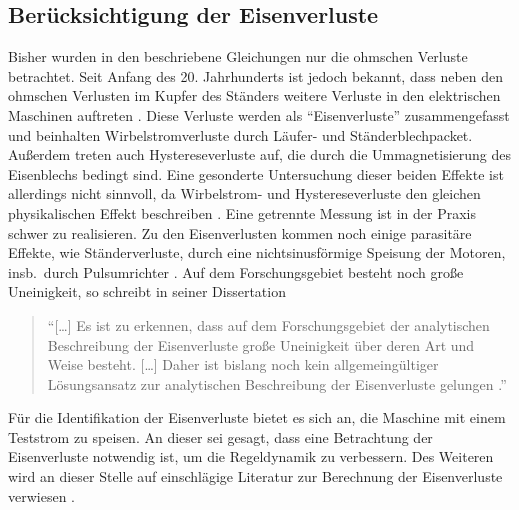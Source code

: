 \documentclass[conference,twocolumn]{IEEEtran}
\begin{document}
\subsection{Berücksichtigung der Eisenverluste}\label{sec:eisenverluste}
Bisher wurden in den beschriebene Gleichungen nur die ohmschen Verluste betrachtet.
Seit Anfang des 20. Jahrhunderts ist jedoch bekannt, dass neben den ohmschen Verlusten im Kupfer des Ständers weitere Verluste in den elektrischen Maschinen auftreten \autocites{reinert_calculation_2001}{stumberger_evaluation_2003}{kilthau_parameter-measurement_2001}{stumberger_evaluation_2003}.
Diese Verluste werden als \enquote{Eisenverluste} zusammengefasst und beinhalten Wirbelstromverluste durch Läufer- und Ständerblechpacket.
Außerdem treten auch Hystereseverluste auf, die durch die Ummagnetisierung des Eisenblechs bedingt sind.
Eine gesonderte Untersuchung dieser beiden Effekte ist allerdings nicht sinnvoll, da Wirbelstrom- und Hystereseverluste den gleichen physikalischen Effekt beschreiben \autocite{reinert_calculation_2001}.
Eine getrennte Messung ist in der Praxis schwer zu realisieren.
Zu den Eisenverlusten kommen noch einige parasitäre Effekte, wie Ständerverluste, durch eine nichtsinusförmige Speisung der Motoren, insb.\ durch Pulsumrichter \autocite{Kellner2012}.
Auf dem Forschungsgebiet besteht noch große Uneinigkeit, so schreibt \textcite{Kellner2012} in seiner Dissertation

\begin{quote}
\enquote{[\ldots] Es ist zu erkennen, dass auf dem Forschungsgebiet der analytischen Beschreibung
der Eisenverluste große Uneinigkeit über deren Art und Weise besteht. [\ldots] Daher ist bislang
noch kein allgemeingültiger Lösungsansatz zur analytischen Beschreibung der
Eisenverluste gelungen \autocite[S.~65]{Kellner2012}.} 
\end{quote}

Für die Identifikation der Eisenverluste bietet es sich an, die Maschine mit einem Teststrom zu speisen.
An dieser sei gesagt, dass eine Betrachtung der Eisenverluste notwendig ist, um die Regeldynamik zu verbessern.
Des Weiteren wird an dieser Stelle auf einschlägige Literatur zur Berechnung der Eisenverluste verwiesen \autocites{Kellner2012}{reinert_calculation_2001}{stumberger_evaluation_2003}.
\end{document}
